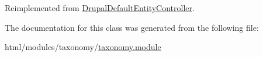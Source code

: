 Reimplemented from \hyperlink{classDrupalDefaultEntityController_ae791ed21b33704e3b315d106354959c9}{DrupalDefaultEntityController}.

The documentation for this class was generated from the following file:\begin{DoxyCompactItemize}
\item 
html/modules/taxonomy/\hyperlink{taxonomy_8module}{taxonomy.module}\end{DoxyCompactItemize}
